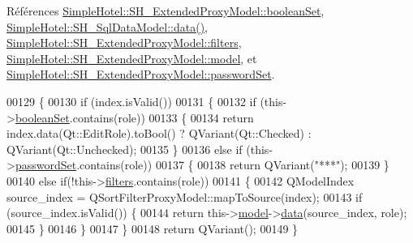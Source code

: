 Références \hyperlink{classSimpleHotel_1_1SH__ExtendedProxyModel_a58b66236a9d0600e55264626d543d960}{Simple\-Hotel\-::\-S\-H\-\_\-\-Extended\-Proxy\-Model\-::boolean\-Set}, \hyperlink{classSimpleHotel_1_1SH__SqlDataModel_a6874d8547f590990f5aab80976ec7c6e}{Simple\-Hotel\-::\-S\-H\-\_\-\-Sql\-Data\-Model\-::data()}, \hyperlink{classSimpleHotel_1_1SH__ExtendedProxyModel_a65b0d93138f5e83616bd277c038063ce}{Simple\-Hotel\-::\-S\-H\-\_\-\-Extended\-Proxy\-Model\-::filters}, \hyperlink{classSimpleHotel_1_1SH__ExtendedProxyModel_ad31718ed4f13ecafcb53dbf1e392b3b0}{Simple\-Hotel\-::\-S\-H\-\_\-\-Extended\-Proxy\-Model\-::model}, et \hyperlink{classSimpleHotel_1_1SH__ExtendedProxyModel_af630ba54d80971ce64dbbf875f94a073}{Simple\-Hotel\-::\-S\-H\-\_\-\-Extended\-Proxy\-Model\-::password\-Set}.


\begin{DoxyCode}
00129 \{
00130     \textcolor{keywordflow}{if} (index.isValid())
00131     \{
00132         \textcolor{keywordflow}{if} (this->\hyperlink{classSimpleHotel_1_1SH__ExtendedProxyModel_a58b66236a9d0600e55264626d543d960}{booleanSet}.contains(role))
00133         \{
00134             \textcolor{keywordflow}{return} index.data(Qt::EditRole).toBool() ? QVariant(Qt::Checked) : QVariant(Qt::Unchecked);
00135         \}
00136         \textcolor{keywordflow}{else} \textcolor{keywordflow}{if} (this->\hyperlink{classSimpleHotel_1_1SH__ExtendedProxyModel_af630ba54d80971ce64dbbf875f94a073}{passwordSet}.contains(role))
00137         \{
00138             \textcolor{keywordflow}{return} QVariant(\textcolor{stringliteral}{"***"});
00139         \}
00140         \textcolor{keywordflow}{else} \textcolor{keywordflow}{if}(!this->\hyperlink{classSimpleHotel_1_1SH__ExtendedProxyModel_a65b0d93138f5e83616bd277c038063ce}{filters}.contains(role))
00141         \{
00142             QModelIndex source\_index = QSortFilterProxyModel::mapToSource(index);
00143             \textcolor{keywordflow}{if} (source\_index.isValid()) \{
00144                 \textcolor{keywordflow}{return} this->\hyperlink{classSimpleHotel_1_1SH__ExtendedProxyModel_ad31718ed4f13ecafcb53dbf1e392b3b0}{model}->\hyperlink{classSimpleHotel_1_1SH__SqlDataModel_a6874d8547f590990f5aab80976ec7c6e}{data}(source\_index, role);
00145             \}
00146         \}
00147     \}
00148     \textcolor{keywordflow}{return} QVariant();
00149 \}
\end{DoxyCode}
